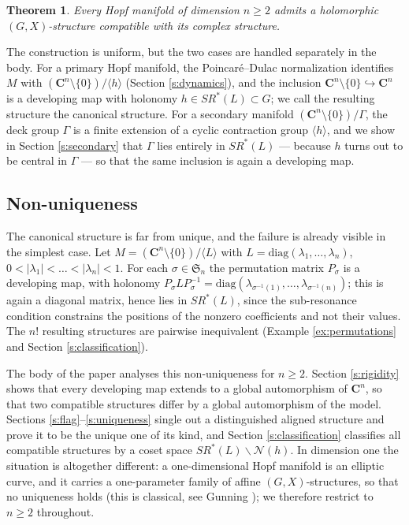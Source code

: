 \documentclass[english,11pt]{amsart}
\newtheorem{main}{Theorem}
\theoremstyle{definition}
\theoremstyle{remark}
\numberwithin{equation}{section}
\newcommand{\C}{\mathbf{C}}
\newcommand{\Norm}{\mathcal{N}}
\begin{document}
\begin{main}\label{main:existence}
Every Hopf manifold of dimension $n\geq2$ admits a holomorphic $(G,X)$-structure compatible with its complex structure.
\end{main}

The construction is uniform, but the two cases are handled separately in the body. For a primary Hopf manifold, the Poincar\'e--Dulac normalization identifies $M$ with $(\C^n\setminus\{0\})/\langle h\rangle$ (Section \ref{s:dynamics}), and the inclusion $\C^n\setminus\{0\}\hookrightarrow\C^n$ is a developing map with holonomy $h\in SR^*(L)\subset G$; we call the resulting structure the canonical structure. For a secondary manifold $(\C^n\setminus\{0\})/\Gamma$, the deck group $\Gamma$ is a finite extension of a cyclic contraction group $\langle h\rangle$, and we show in Section \ref{s:secondary} that $\Gamma$ lies entirely in $SR^*(L)$ --- because $h$ turns out to be central in $\Gamma$ --- so that the same inclusion is again a developing map.

\subsection*{Non-uniqueness}
The canonical structure is far from unique, and the failure is already visible in the simplest case. Let $M=(\C^n\setminus\{0\})/\langle L\rangle$ with $L=\mathrm{diag}(\lambda_1,\dots,\lambda_n)$, $0<|\lambda_1|<\dots<|\lambda_n|<1$. For each $\sigma\in\mathfrak{S}_n$ the permutation matrix $P_\sigma$ is a developing map, with holonomy $P_\sigma L P_\sigma^{-1}=\mathrm{diag}(\lambda_{\sigma^{-1}(1)},\dots,\lambda_{\sigma^{-1}(n)})$; this is again a diagonal matrix, hence lies in $SR^*(L)$, since the sub-resonance condition constrains the positions of the nonzero coefficients and not their values. The $n!$ resulting structures are pairwise inequivalent (Example \ref{ex:permutations} and Section \ref{s:classification}).

The body of the paper analyses this non-uniqueness for $n\geq2$. Section \ref{s:rigidity} shows that every developing map extends to a global automorphism of $\C^n$, so that two compatible structures differ by a global automorphism of the model. Sections \ref{s:flag}--\ref{s:uniqueness} single out a distinguished aligned structure and prove it to be the unique one of its kind, and Section \ref{s:classification} classifies all compatible structures by a coset space $SR^*(L)\backslash\Norm(h)$. In dimension one the situation is altogether different: a one-dimensional Hopf manifold is an elliptic curve, and it carries a one-parameter family of affine $(G,X)$-structures, so that no uniqueness holds (this is classical, see Gunning \cite{Gunning}); we therefore restrict to $n\geq2$ throughout.
\end{document}
